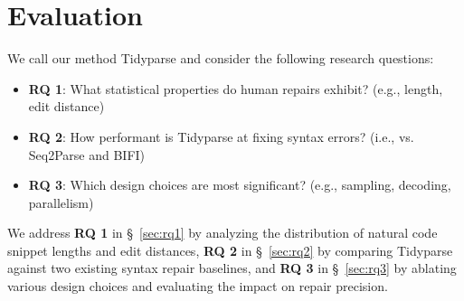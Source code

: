 \documentclass[sigplan,acmsmall,nonacm,screen]{acmart}\settopmatter{printfolios=false,printccs=false,printacmref=false}
\begin{document}


\section{Evaluation}

We call our method Tidyparse and consider the following research questions:

\begin{itemize}
\item \textbf{RQ 1}: What statistical properties do human repairs exhibit? (e.g., length, edit distance)
\item \textbf{RQ 2}: How performant is Tidyparse at fixing syntax errors? (i.e., vs. Seq2Parse and BIFI)
\item \textbf{RQ 3}: Which design choices are most significant? (e.g., sampling, decoding, parallelism)
\end{itemize}

We address \textbf{RQ 1} in \S~\ref{sec:rq1} by analyzing the distribution of natural code snippet lengths and edit distances, \textbf{RQ 2} in \S~\ref{sec:rq2} by comparing Tidyparse against two existing syntax repair baselines, and \textbf{RQ 3} in \S~\ref{sec:rq3} by ablating various design choices and evaluating the impact on repair precision.
\end{document}

